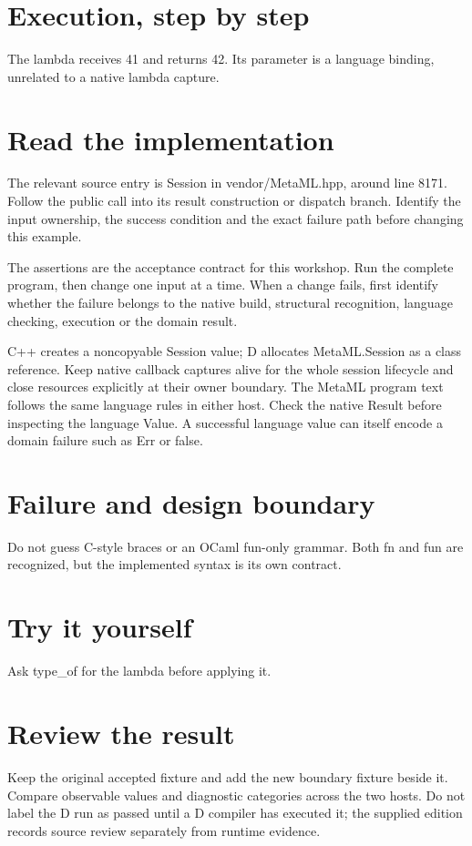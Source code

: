 
\section*{Execution, step by step}
The lambda receives 41 and returns 42. Its parameter is a language binding, unrelated to a native lambda capture.

\section*{Read the implementation}
The relevant source entry is Session in vendor/MetaML.hpp, around line 8171. Follow the public call into its result construction or dispatch branch. Identify the input ownership, the success condition and the exact failure path before changing this example.

The assertions are the acceptance contract for this workshop. Run the complete program, then change one input at a time. When a change fails, first identify whether the failure belongs to the native build, structural recognition, language checking, execution or the domain result.

\clearpage
{}
C++ creates a noncopyable Session value; D allocates MetaML.Session as a class reference. Keep native callback captures alive for the whole session lifecycle and close resources explicitly at their owner boundary. The MetaML program text follows the same language rules in either host. Check the native Result before inspecting the language Value. A successful language value can itself encode a domain failure such as Err or false.


\section*{Failure and design boundary}
Do not guess C-style braces or an OCaml fun-only grammar. Both fn and fun are recognized, but the implemented syntax is its own contract.

\section*{Try it yourself}
Ask type\_of for the lambda before applying it.

\section*{Review the result}
Keep the original accepted fixture and add the new boundary fixture beside it. Compare observable values and diagnostic categories across the two hosts. Do not label the D run as passed until a D compiler has executed it; the supplied edition records source review separately from runtime evidence.

